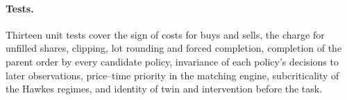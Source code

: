 \paragraph{Tests.} Thirteen unit tests cover the sign of costs for buys and sells, the charge for unfilled shares, clipping, lot rounding and forced completion, completion of the parent order by every candidate policy, invariance of each policy's decisions to later observations, price--time priority in the matching engine, subcriticality of the Hawkes regimes, and identity of twin and intervention before the task.
